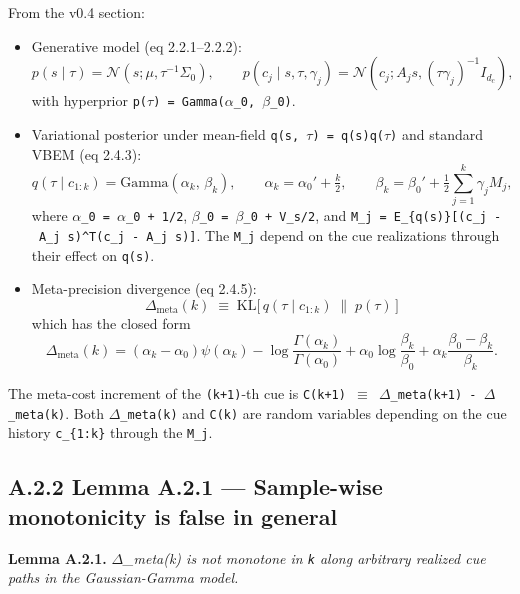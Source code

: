 \documentclass{article}
\begin{document}
From the v0.4 section:

\begin{itemize}
\item
  Generative model (eq 2.2.1--2.2.2): \[
  p(s \mid \tau) = \mathcal{N}(s; \mu, \tau^{-1}\Sigma_0), \qquad
  p(c_j \mid s, \tau, \gamma_j) = \mathcal{N}(c_j; A_j s, (\tau\gamma_j)^{-1} I_{d_c}),
  \] with hyperprior \texttt{p(\ensuremath{\tau})\ =\ Gamma(\ensuremath{\alpha}\_0,\ \ensuremath{\beta}\_0)}.
\item
  Variational posterior under mean-field \texttt{q(s,\ \ensuremath{\tau})\ =\ q(s)q(\ensuremath{\tau})}
  and standard VBEM (eq 2.4.3): \[
  q(\tau \mid c_{1:k}) = \mathrm{Gamma}\!\left(\alpha_k,\, \beta_k\right), \qquad
  \alpha_k = \alpha_0' + \tfrac{k}{2}, \qquad
  \beta_k = \beta_0' + \tfrac{1}{2}\sum_{j=1}^{k} \gamma_j M_j,
  \] where \texttt{\ensuremath{\alpha}\_0\textquotesingle{}\ =\ \ensuremath{\alpha}\_0\ +\ 1/2},
  \texttt{\ensuremath{\beta}\_0\textquotesingle{}\ =\ \ensuremath{\beta}\_0\ +\ V\_s/2}, and
  \texttt{M\_j\ =\ E\_\{q(s)\}{[}(c\_j\ -\ A\_j\ s)\^{}T(c\_j\ -\ A\_j\ s){]}}.
  The \texttt{M\_j} depend on the cue realizations through their effect
  on \texttt{q(s)}.
\item
  Meta-precision divergence (eq 2.4.5): \[
  \Delta_{\mathrm{meta}}(k) \;\equiv\; \mathrm{KL}\!\big[\,q(\tau \mid c_{1:k}) \;\big\|\; p(\tau)\,\big]
  \] which has the closed form \[
  \Delta_{\mathrm{meta}}(k) = (\alpha_k - \alpha_0)\psi(\alpha_k) - \log\!\frac{\Gamma(\alpha_k)}{\Gamma(\alpha_0)} + \alpha_0 \log\!\frac{\beta_k}{\beta_0} + \alpha_k\frac{\beta_0 - \beta_k}{\beta_k}.
  \]
\end{itemize}

The meta-cost increment of the \texttt{(k+1)}-th cue is
\texttt{C(k+1)\ \ensuremath{\equiv}\ \ensuremath{\Delta}\_meta(k+1)\ -\ \ensuremath{\Delta}\_meta(k)}. Both
\texttt{\ensuremath{\Delta}\_meta(k)} and \texttt{C(k)} are random variables depending on
the cue history \texttt{c\_\{1:k\}} through the \texttt{M\_j}.

\subsection{A.2.2 Lemma A.2.1 --- Sample-wise monotonicity is false in
general}\label{a.2.2-lemma-a.2.1-sample-wise-monotonicity-is-false-in-general}

\textbf{Lemma A.2.1.} \emph{\ensuremath{\Delta}\_meta(k) is not monotone in \texttt{k}
along arbitrary realized cue paths in the Gaussian-Gamma model.}
\end{document}
